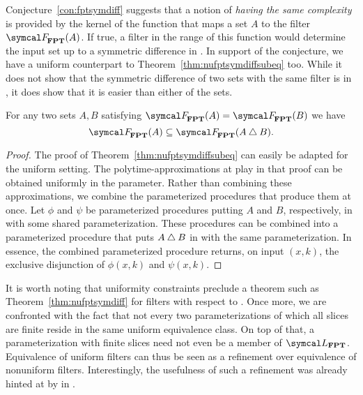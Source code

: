 Conjecture~\ref{con:fptsymdiff} suggests that a notion of \emph{having the same complexity} is provided by the kernel of the function that maps a set $A$ to the filter $\calF_\cl{FPT}(A)$.
If true, a filter in the range of this function would determine the input set up to a symmetric difference in .
In support of the conjecture, we have a uniform counterpart to Theorem~\ref{thm:nufptsymdiffsubeq} too.
While it does not show that the symmetric difference of two sets with the same filter is in , it does show that it is easier than either of the sets.
\begin{theorem}
  For any two sets $A, B$ satisfying $\calF_\cl{FPT}(A) = \calF_\cl{FPT}(B)$ we have
  \begin{equation*}
    \calF_\cl{FPT}(A) \subseteq \calF_\cl{FPT}(A \symdiff B).
  \end{equation*}
\end{theorem}
\begin{proof}
  The proof of Theorem~\ref{thm:nufptsymdiffsubeq} can easily be adapted for the uniform setting.
  The polytime-approximations at play in that proof can be obtained uniformly in the parameter.
  Rather than combining these approximations, we combine the parameterized procedures that produce them at once.
  Let $\phi$ and $\psi$ be parameterized procedures putting $A$ and $B$, respectively, in  with some shared parameterization.
  These procedures can be combined into a parameterized procedure that puts $A \bigtriangleup B$ in  with the same parameterization.
  In essence, the combined parameterized procedure returns, on input $(x, k)$, the exclusive disjunction of $\phi(x, k)$ and $\psi(x, k)$.
\end{proof}

It is worth noting that uniformity constraints preclude a theorem such as Theorem~\ref{thm:nufptsymdiff} for filters with respect to .
Once more, we are confronted with the fact that not every two parameterizations of which all slices are finite reside in the same uniform equivalence class.
On top of that, a parameterization with finite slices need not even be a member of $\calL_\cl{FPT}$.
Equivalence of uniform filters can thus be seen as a refinement over equivalence of nonuniform filters.
Interestingly, the usefulness of such a refinement was already hinted at by \textcite{orponen1986classification} in \citeyear{orponen1986classification}.

